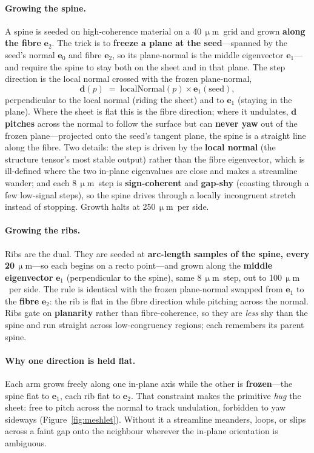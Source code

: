 \documentclass[10pt,twocolumn,a4paper]{article}
\newcommand{\um}{\ensuremath{\,\upmu\mathrm{m}}}      %
\begin{document}
\paragraph{Growing the spine.} A spine is seeded on high-coherence material on a
40\um\ grid and grown \textbf{along the fibre} $\mathbf{e}_2$. The trick is to
\textbf{freeze a plane at the seed}---spanned by the seed's normal $\mathbf{e}_0$
and fibre $\mathbf{e}_2$, so its plane-normal is the middle eigenvector
$\mathbf{e}_1$---and require the spine to stay both on the sheet and in that
plane. The step direction is the local normal crossed with the frozen
plane-normal,
\begin{equation}
  \mathbf{d}(p) \;=\; \mathrm{localNormal}(p)\times \mathbf{e}_1(\text{seed}),
\end{equation}
perpendicular to the local normal (riding the sheet) and to $\mathbf{e}_1$
(staying in the plane). Where the sheet is flat this is the fibre direction;
where it undulates, $\mathbf{d}$ \textbf{pitches} across the normal to follow the
surface but can \textbf{never yaw} out of the frozen plane---projected onto the
seed's tangent plane, the spine is a straight line along the fibre. Two details:
the step is driven by the \textbf{local normal} (the structure tensor's most
stable output) rather than the fibre eigenvector, which is ill-defined where the
two in-plane eigenvalues are close and makes a streamline wander; and each 8\um\
step is \textbf{sign-coherent} and \textbf{gap-shy} (coasting through a few
low-signal steps), so the spine drives through a locally incongruent stretch
instead of stopping. Growth halts at 250\um\ per side.

\paragraph{Growing the ribs.} Ribs are the dual. They are seeded at
\textbf{arc-length samples of the spine, every 20\um}---so each begins on a recto
point---and grown along the \textbf{middle eigenvector} $\mathbf{e}_1$
(perpendicular to the spine), same 8\um\ step, out to 100\um\ per side. The rule
is identical with the frozen plane-normal swapped from $\mathbf{e}_1$ to the
\textbf{fibre} $\mathbf{e}_2$: the rib is flat in the fibre direction while
pitching across the normal. Ribs gate on \textbf{planarity} rather than
fibre-coherence, so they are \emph{less} shy than the spine and run straight
across low-congruency regions; each remembers its parent spine.

\paragraph{Why one direction is held flat.} Each arm grows freely along one
in-plane axis while the other is \textbf{frozen}---the spine flat to
$\mathbf{e}_1$, each rib flat to $\mathbf{e}_2$. That constraint makes the
primitive \emph{hug} the sheet: free to pitch across the normal to track
undulation, forbidden to yaw sideways (Figure~\ref{fig:meshlet}). Without it a
streamline meanders, loops, or slips across a faint gap onto the neighbour
wherever the in-plane orientation is ambiguous.
\end{document}
